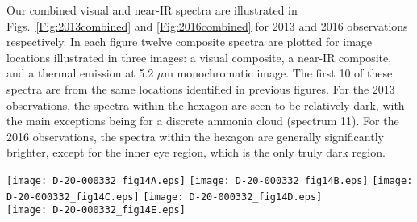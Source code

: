 \documentclass[article,11pt]{emulateapj}
\def\mum{$\mu$m }
\def\mumx{$\mu$m}
\def\nht{NH$_3$ }
\begin{document}
Our combined visual and near-IR spectra are illustrated in Figs.\ \ref{Fig:2013combined} 
and \ref{Fig:2016combined} for 2013 and 2016 observations respectively.  In each figure
twelve composite spectra are plotted for image locations illustrated
in three images: a visual composite, a near-IR composite, and a thermal emission at 5.2 \mum
monochromatic image.  The first 10 of these spectra are from the same locations
identified in previous figures.  For the 2013 observations, the spectra within the hexagon are seen
to be relatively dark, with the main exceptions being for a discrete ammonia cloud (spectrum
11).  For the 2016 observations, the spectra within the hexagon are generally significantly
brighter, except for the inner eye region, which is the only truly dark region.

\begin{figure*}[!htb]\centering
\texttt{[image: D-20-000332\_fig14A.eps]}  %
\texttt{[image: D-20-000332\_fig14B.eps]} %
\texttt{[image: D-20-000332\_fig14C.eps]} %
\texttt{[image: D-20-000332\_fig14D.eps]}\\  %
\texttt{[image: D-20-000332\_fig14E.eps]}\\ %
\caption{VIMS 2013 observations and selected spectral sampling
  locations indicated by numbered circles in reflected-light visual
  (A) and near-IR (B) composites, and also at a thermal emission
  wavelength of 5.04 \mum (C). Spectra from these locations are shown
  in panels D and E. Note the nearly factor of ten drop between 2.7
  \mum and 3 \mum for spectrum 11 (E), and its sharp drop between
1.9 and 2 \mumx,  which are signatures of absorption by \nht
  ice particles. Similar, but more attenuated features can be seen
in spectrum 2 (D). The vertical dotted lines in D and E mark the
  wavelength at which visual and near-IR VIMS spectra are joined.  The
  nearly horizontal dotted line is the FWHM (in \mumx) as a function of
  wavelength. \label{Fig:2013combined}}
\end{figure*}
\end{document}
